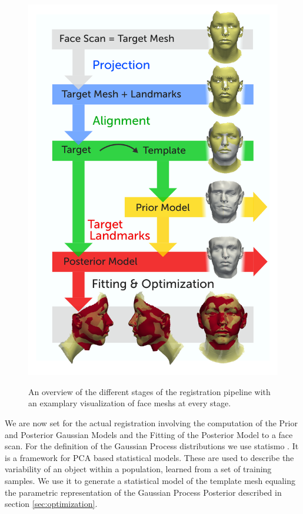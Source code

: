 \begin{figure}[h!]
\centering
\includegraphics[width=.9\textwidth]{./resources/figures/pipeline.pdf}
\label{fig:pipeline}
\vspace{-20pt}
\caption{An overview of the different stages of the registration pipeline with an examplary visualization of face meshs at every stage.}
\end{figure}

We are now set for the actual registration involving the computation of the Prior and Posterior Gaussian Models and the Fitting of the Posterior Model to a face scan. For the definition of the Gaussian Process distributions we use statismo \cite{statismo}. It is a framework for PCA based statistical models. These are used to describe the variability of an object within a population, learned from a set of training samples. We use it to generate a statistical
model of the template mesh equaling the parametric representation of the Gaussian Process Posterior described in section \ref{sec:optimization}. 

